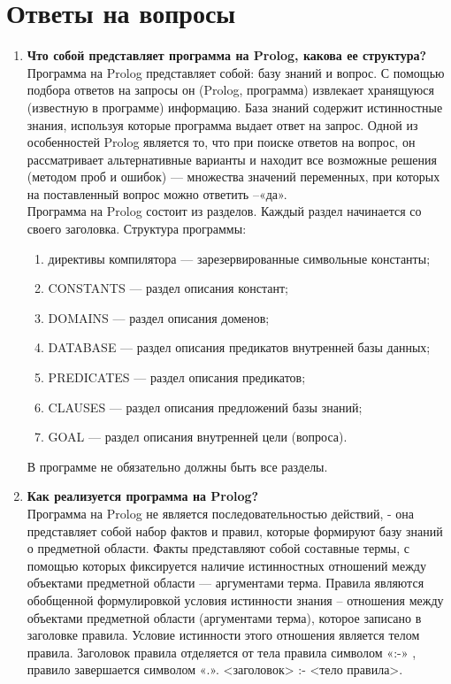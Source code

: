 \newpage
\section*{Ответы на вопросы}
\begin{enumerate}
    \item \textbf{Что собой представляет программа на Prolog, какова ее структура?}\\
    	Программа на Prolog представляет собой: базу знаний и вопрос. С помощью подбора ответов на запросы он (Prolog, программа) извлекает хранящуюся (известную в программе) информацию. База знаний содержит истинностные знания, используя которые программа выдает ответ на запрос. Одной из особенностей Prolog является то, что при поиске ответов на вопрос, он рассматривает альтернативные варианты и находит все возможные решения (методом проб и ошибок) — множества значений переменных, при которых на поставленный вопрос можно ответить –«да».
    	\\
    	Программа на Prolog состоит из разделов. Каждый раздел начинается со своего заголовка. Структура программы: 
    	\begin{enumerate}
    		\item директивы компилятора — зарезервированные символьные константы;
    		\item CONSTANTS — раздел описания констант;
    		\item DOMAINS — раздел описания доменов;
    		\item DATABASE — раздел описания предикатов внутренней базы данных;
    		\item PREDICATES — раздел описания предикатов;
    		\item CLAUSES — раздел описания предложений базы знаний;
    		\item GOAL — раздел описания внутренней цели (вопроса).
    	\end{enumerate}
    	В программе не обязательно должны быть все разделы.
     \item \textbf{Как реализуется программа на Prolog?}\\
  		Программа на Prolog не является последовательностью действий, - она представляет собой набор фактов и правил, которые формируют базу знаний о предметной области. Факты представляют собой составные термы, с помощью которых фиксируется наличие истинностных отношений между объектами предметной области — аргументами терма. Правила являются обобщенной формулировкой условия истинности знания – отношения между объектами предметной области (аргументами терма), которое записано в заголовке правила. Условие истинности этого отношения  является телом правила. Заголовок правила отделяется от тела правила символом    «:-»  , правило завершается символом  «.».  <заголовок> :- <тело правила>. \\

\end{enumerate}

